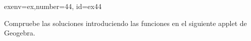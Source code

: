 \begin{SolutionCollapsible}{exenv=ex,number=44, id=ex44}

		Compruebe las soluciones introduciendo las funciones en el siguiente applet de Geogebra.
	
\end{SolutionCollapsible}

